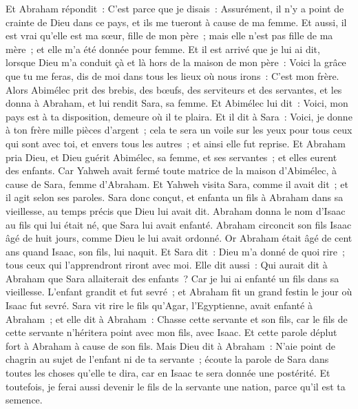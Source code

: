 \begin{multicols}{2}
Et Abraham répondit~: C'est parce que je disais~: Assurément, il n'y a point de crainte de Dieu dans ce pays, et ils me tueront à cause de ma femme.
Et aussi, il est vrai qu'elle est ma sœur, fille de mon père~; mais elle n'est pas fille de ma mère~; et elle m'a été donnée pour femme.
Et il est arrivé que je lui ai dit, lorsque Dieu m'a conduit çà et là hors de la maison de mon père~: Voici la grâce que tu me feras, dis de moi dans tous les lieux où nous irons~: C'est mon frère.
Alors Abimélec prit des brebis, des bœufs, des serviteurs et des servantes, et les donna à Abraham, et lui rendit Sara, sa femme.
Et Abimélec lui dit~: Voici, mon pays est à ta disposition, demeure où il te plaira.
Et il dit à Sara~: Voici, je donne à ton frère mille pièces d'argent~; cela te sera un voile sur les yeux pour tous ceux qui sont avec toi, et envers tous les autres~; et ainsi elle fut reprise.
Et Abraham pria Dieu, et Dieu guérit Abimélec, sa femme, et ses servantes~; et elles eurent des enfants.
Car Yahweh avait fermé toute matrice de la maison d'Abimélec, à cause de Sara, femme d'Abraham.
\VerseOne{}Et Yahweh visita Sara, comme il avait dit~; et il agit selon ses paroles.
Sara donc conçut, et enfanta un fils à Abraham dans sa vieillesse, au temps précis que Dieu lui avait dit.
Abraham donna le nom d'Isaac au fils qui lui était né, que Sara lui avait enfanté.
Abraham circoncit son fils Isaac âgé de huit jours, comme Dieu le lui avait ordonné.
Or Abraham était âgé de cent ans quand Isaac, son fils, lui naquit.
Et Sara dit~: Dieu m'a donné de quoi rire~; tous ceux qui l'apprendront riront avec moi.
Elle dit aussi~: Qui aurait dit à Abraham que Sara allaiterait des enfants~? Car je lui ai enfanté un fils dans sa vieillesse.
L'enfant grandit et fut sevré~; et Abraham fit un grand festin le jour où Isaac fut sevré.
Sara vit rire le fils qu'Agar, l'Egyptienne, avait enfanté à Abraham~;
et elle dit à Abraham~: Chasse cette servante et son fils, car le fils de cette servante n'héritera point avec mon fils, avec Isaac.
Et cette parole déplut fort à Abraham à cause de son fils.
Mais Dieu dit à Abraham~: N'aie point de chagrin au sujet de l'enfant ni de ta servante~; écoute la parole de Sara dans toutes les choses qu'elle te dira, car en Isaac te sera donnée une postérité.
Et toutefois, je ferai aussi devenir le fils de la servante une nation, parce qu'il est ta semence.

\end{multicols}
